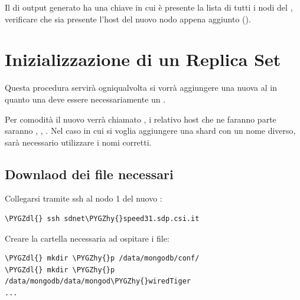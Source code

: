\documentclass[a4paper,10pt,english]{sphinxmanual}
\def\PYGZdl{\char`\$}
\def\PYGZhy{\char`\-}
\begin{document}
Il  di output generato ha una chiave  in cui è presente la lista di tutti i
nodi del {\hyperref[cluster_architecture/architecture:replica-set]{\emph{}}}, verificare che sia presente l'host del nuovo nodo appena aggiunto
().


\chapter{Inizializzazione di un Replica Set}
\label{cluster_architecture/init_replica_set:init-replica-set}\label{cluster_architecture/init_replica_set::doc}\label{cluster_architecture/init_replica_set:inizializzazione-di-un-replica-set}
Questa procedura servirà ogniqualvolta si vorrà aggiungere una nuova {\hyperref[cluster_architecture/architecture:shard]{\emph{}}} al
{\hyperref[cluster_architecture/architecture:cluster]{\emph{}}} in quanto una {\hyperref[cluster_architecture/architecture:shard]{\emph{}}} deve essere necessariamente un {\hyperref[cluster_architecture/architecture:replica-set]{\emph{}}}.

Per comodità il nuovo {\hyperref[cluster_architecture/architecture:replica-set]{\emph{}}} verrà chiamato , i relativo host che ne faranno
parte saranno , ,
.
Nel caso in cui si voglia aggiungere una shard con un nome diverso, sarà necessario utilizzare i
nomi corretti.


\section{Downlaod dei file necessari}
\label{cluster_architecture/init_replica_set:downlaod-dei-file-necessari}
Collegarsi tramite ssh al nodo 1 del nuovo {\hyperref[cluster_architecture/architecture:replica-set]{\emph{}}}:

\begin{Verbatim}[commandchars=\\\{\}]
\PYGZdl{} ssh sdnet\PYGZhy{}speed31.sdp.csi.it
\end{Verbatim}

Creare la cartella necessaria ad ospitare i file:

\begin{Verbatim}[commandchars=\\\{\}]
\PYGZdl{} mkdir \PYGZhy{}p /data/mongodb/conf/
\PYGZdl{} mkdir \PYGZhy{}p /data/mongodb/data/mongod\PYGZhy{}wiredTiger
...
\end{Verbatim}
\end{document}
